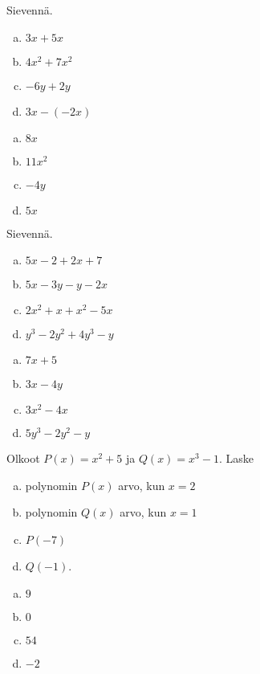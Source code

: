 \begin{tehtavasivu}
\begin{tehtava}
    Sievennä.
    \begin{enumerate}[a)]
        \item $3x+5x $
        \item $4x^2+7x^2$
        \item $-6y+2y $
        \item $3x-(-2x)$
    \end{enumerate}
    \begin{vastaus}
        \begin{enumerate}[a)]
            \item $8x$
            \item $11x^2$
            \item $-4y$
            \item $5x$
        \end{enumerate}
    \end{vastaus}
\end{tehtava}

\begin{tehtava}
    Sievennä.
    \begin{enumerate}[a)]
    	\item $5x-2+2x+7$
        \item $5x-3y-y-2x$
        \item $2x^2+x+x^2-5x$
        \item $y^3 - 2y^2+4y^3-y $
    \end{enumerate}
    \begin{vastaus}
        \begin{enumerate}[a)]
        	\item $7x+5$
            \item $3x-4y$
            \item $3x^2-4x$
            \item $5y^3-2y^2-y$
        \end{enumerate}
    \end{vastaus}
\end{tehtava}

\begin{tehtava}
    Olkoot $P(x)=x^2+5$ ja $Q(x)=x^3-1$. Laske
    \begin{enumerate}[a)]
        \item polynomin $P(x)$ arvo, kun $x=2$
        \item polynomin $Q(x)$ arvo, kun $x=1$
        \item $P(-7)$
        \item $Q(-1)$.
    \end{enumerate}
    \begin{vastaus}
        \begin{enumerate}[a)]
            \item $9$ %
            \item $0$ %
            \item $54$ %
            \item $-2$ %
        \end{enumerate}
    \end{vastaus}
\end{tehtava}


\end{tehtavasivu}
